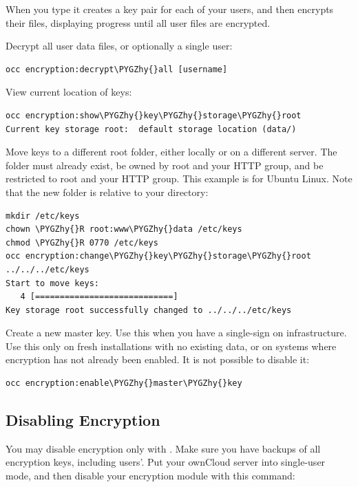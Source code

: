 \documentclass[letterpaper,10pt,english]{sphinxmanual}
\def\PYGZhy{\char`\-}
\begin{document}
When you type  it creates a key pair for each of your users, and then
encrypts their files, displaying progress until all user files are encrypted.

Decrypt all user data files, or optionally a single user:

\begin{Verbatim}[commandchars=\\\{\}]
occ encryption:decrypt\PYGZhy{}all [username]
\end{Verbatim}

View current location of keys:

\begin{Verbatim}[commandchars=\\\{\}]
occ encryption:show\PYGZhy{}key\PYGZhy{}storage\PYGZhy{}root
Current key storage root:  default storage location (data/)
\end{Verbatim}

Move keys to a different root folder, either locally or on a different server.
The folder must already exist, be owned by root and your HTTP group, and be
restricted to root and your HTTP group. This example is for Ubuntu Linux. Note
that the new folder is relative to your  directory:

\begin{Verbatim}[commandchars=\\\{\}]
mkdir /etc/keys
chown \PYGZhy{}R root:www\PYGZhy{}data /etc/keys
chmod \PYGZhy{}R 0770 /etc/keys
occ encryption:change\PYGZhy{}key\PYGZhy{}storage\PYGZhy{}root ../../../etc/keys
Start to move keys:
   4 [============================]
Key storage root successfully changed to ../../../etc/keys
\end{Verbatim}

Create a new master key. Use this when you have a single-sign on
infrastructure.  Use this only on fresh installations with no existing data, or
on systems where encryption has not already been enabled. It is not possible to
disable it:

\begin{Verbatim}[commandchars=\\\{\}]
occ encryption:enable\PYGZhy{}master\PYGZhy{}key
\end{Verbatim}


\subsection{Disabling Encryption}
\label{configuration_files/encryption_configuration:disabling-encryption}
You may disable encryption only with . Make sure you have backups of all
encryption keys, including users'. Put your ownCloud server into
single-user mode, and then disable your encryption module with this command:
\end{document}
